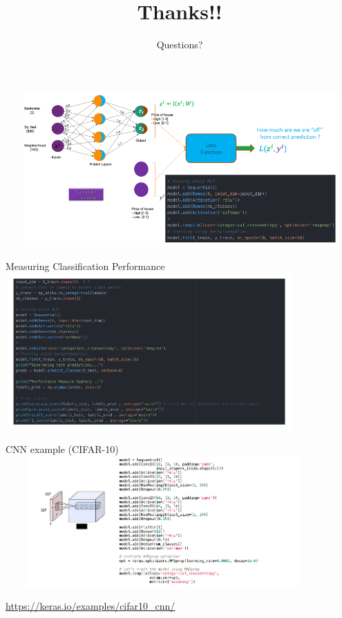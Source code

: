 \documentclass[aspectratio=169,14pt,usenames,dvipsnames]{beamer}
\begin{document}
\begin{frame}

\includegraphics[width=14.5cm, height=6cm]{Keras_Images/Ker_21.png}

\end{frame}


\begin{frame}{Measuring Classification Performance}
\centering
\includegraphics[width=11cm, height=6cm]{Keras_Images/Ker_22.png}

\end{frame}


\begin{frame}{CNN example (CIFAR-10)}
\centering
\includegraphics[width=12cm, height=5cm]{Keras_Images/Ker_23.png}

\underline{\url{https://keras.io/examples/cifar10_cnn/}}

\end{frame}


{\1
\begin{frame}
	\title{Thanks!!}
	\subtitle{Questions?}
	\maketitle
\end{frame}}
\end{document}
